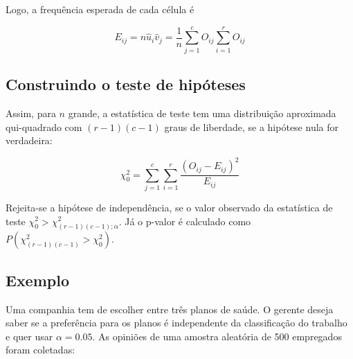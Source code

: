 \documentclass[
]{book}
\begin{document}
Logo, a frequência esperada de cada célula é

\[E_{ij}=n\hat u_i\hat v_j=\frac{1}{n}\sum_{j=1}^cO_{ij}\sum_{i=1}^rO_{ij}\]

\hypertarget{construindo-o-teste-de-hipuxf3teses-5}{%
\subsection{Construindo o teste de hipóteses}\label{construindo-o-teste-de-hipuxf3teses-5}}

Assim, para \(n\) grande, a estatística de teste tem uma distribuição aproximada qui-quadrado com \((r-1)(c-1)\) graus de liberdade, se a hipótese nula for verdadeira:

\[\chi^2_0=\sum_{j=1}^c\sum_{i=1}^r\frac{(O_{ij}-E_{ij})^2}{E_{ij}}\]

Rejeita-se a hipótese de independência, se o valor observado da estatística de teste \(\chi^2_0>\chi^2_{(r-1)(c-1);\alpha}\). Já o p-valor é calculado como \(P(\chi^2_{(r-1)(c-1)}>\chi^2_0)\).

\hypertarget{exemplo-8}{%
\subsection{Exemplo}\label{exemplo-8}}

Uma companhia tem de escolher entre três planos de saúde. O gerente deseja saber se a preferência para os planos é independente da classificação do trabalho e quer usar \(\alpha=0.05\). As opiniões de uma amostra aleatória de 500 empregados foram coletadas:
\end{document}
